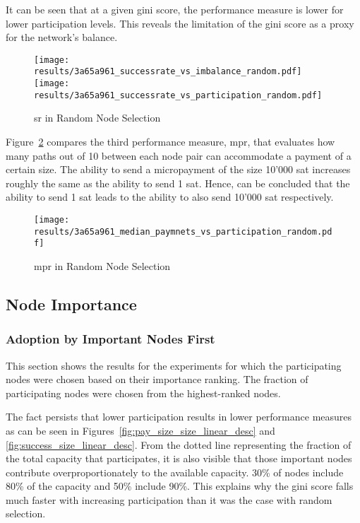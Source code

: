 \documentclass[final]{fhnwreport}       %
\begin{document}
It can be seen that at a given \gls{gini} score, the performance measure is lower for lower participation levels. This reveals the limitation of the \gls{gini} score as a \gls{proxy} for the network's balance.

\begin{figure}[htp]
\centering
\texttt{[image: results/3a65a961\_successrate\_vs\_imbalance\_random.pdf]}\hfill
\texttt{[image: results/3a65a961\_successrate\_vs\_participation\_random.pdf]}
\caption{\gls{sr} in Random Node Selection}
\label{fig:success_random}
\end{figure}

Figure~\ref{fig:sizes_random} compares the third performance measure, \gls{mpr}, that evaluates how many paths out of 10 between each node pair can accommodate a payment of a certain size. The ability to send a micropayment of the size 10'000 sat increases roughly the same as the ability to send 1 sat. Hence, can be concluded that the ability to send 1 sat leads to the ability to also send 10'000 sat respectively. 

\begin{figure}[htp]
\centering
\texttt{[image: results/3a65a961\_median\_paymnets\_vs\_participation\_random.pdf]}
\caption{\gls{mpr} in Random Node Selection}
\label{fig:sizes_random}
\end{figure}

\subsection{Node Importance}
\subsubsection{Adoption by Important Nodes First}\label{subsub:desc}
This section shows the results for the experiments for which the participating nodes were chosen based on their importance ranking. The fraction of participating nodes were chosen from the highest-ranked nodes. 

The fact persists that lower participation results in lower performance measures as can be seen in Figures~\ref{fig:pay_size_size_linear_desc} and \ref{fig:success_size_linear_desc}. From the dotted line representing the fraction of the total capacity that participates, it is also visible that those important nodes contribute overproportionately to the available capacity. 30\% of nodes include 80\% of the capacity and 50\% include 90\%. This explains why the \gls{gini} score falls much faster with increasing participation than it was the case with random selection.
\end{document}
